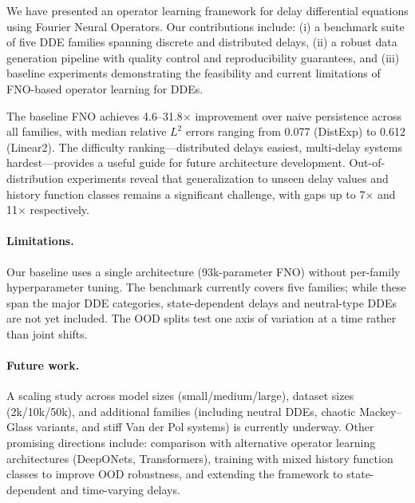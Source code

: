 
We have presented an operator learning framework for delay differential equations
using Fourier Neural Operators.  Our contributions include: (i) a benchmark suite
of five DDE families spanning discrete and distributed delays, (ii) a robust data
generation pipeline with quality control and reproducibility guarantees, and
(iii) baseline experiments demonstrating the feasibility and current limitations
of FNO-based operator learning for DDEs.

The baseline FNO achieves 4.6--31.8$\times$ improvement over naive persistence across
all families, with median relative $L^2$ errors ranging from 0.077 (DistExp) to 0.612
(Linear2).  The difficulty ranking---distributed delays easiest, multi-delay systems
hardest---provides a useful guide for future architecture development.  Out-of-distribution
experiments reveal that generalization to unseen delay values and history function classes
remains a significant challenge, with gaps up to 7$\times$ and 11$\times$ respectively.

\paragraph{Limitations.}
Our baseline uses a single architecture (93k-parameter FNO) without per-family
hyperparameter tuning.  The benchmark currently covers five families; while these
span the major DDE categories, state-dependent delays and neutral-type DDEs are
not yet included.  The OOD splits test one axis of variation at a time rather than
joint shifts.

\paragraph{Future work.}
A scaling study across model sizes (small/medium/large), dataset sizes
(2k/10k/50k), and additional families (including neutral DDEs, chaotic
Mackey--Glass variants, and stiff Van der Pol systems) is currently underway.
Other promising directions include: comparison with alternative operator learning
architectures (DeepONets, Transformers), training with mixed history function
classes to improve OOD robustness, and extending the framework to
state-dependent and time-varying delays.

